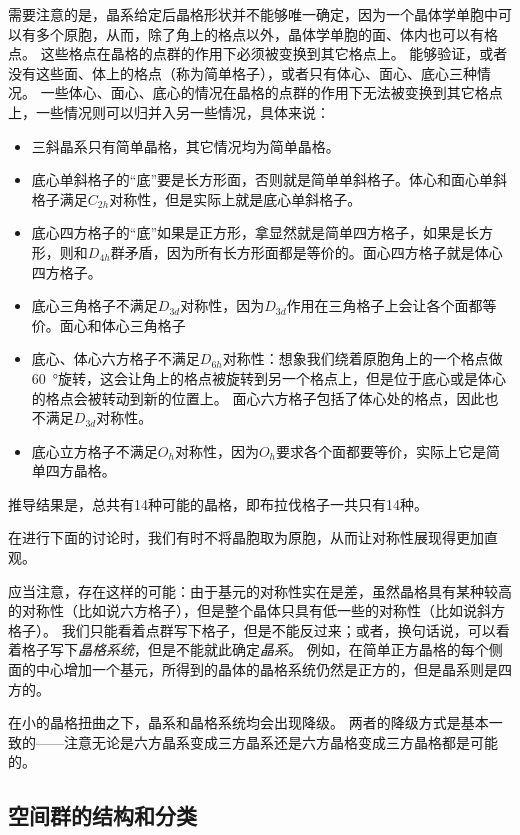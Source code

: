 需要注意的是，晶系给定后晶格形状并不能够唯一确定，因为一个晶体学单胞中可以有多个原胞，从而，除了角上的格点以外，晶体学单胞的面、体内也可以有格点。
这些格点在晶格的点群的作用下必须被变换到其它格点上。
能够验证，或者没有这些面、体上的格点（称为简单格子），或者只有体心、面心、底心三种情况。
一些体心、面心、底心的情况在晶格的点群的作用下无法被变换到其它格点上，一些情况则可以归并入另一些情况，具体来说：
\begin{itemize}
    \item 三斜晶系只有简单晶格，其它情况均为简单晶格。
    \item 底心单斜格子的“底”要是长方形面，否则就是简单单斜格子。体心和面心单斜格子满足$C_{2h}$对称性，但是实际上就是底心单斜格子。
    \item 底心四方格子的“底”如果是正方形，拿显然就是简单四方格子，如果是长方形，则和$D_{4h}$群矛盾，因为所有长方形面都是等价的。面心四方格子就是体心四方格子。
    \item 底心三角格子不满足$D_{3d}$对称性，因为$D_{3d}$作用在三角格子上会让各个面都等价。面心和体心三角格子%
    \item 底心、体心六方格子不满足$D_{6h}$对称性：想象我们绕着原胞角上的一个格点做\SI{60}{\degree}旋转，这会让角上的格点被旋转到另一个格点上，但是位于底心或是体心的格点会被转动到新的位置上。
    面心六方格子包括了体心处的格点，因此也不满足$D_{3d}$对称性。
    \item 底心立方格子不满足$O_h$对称性，因为$O_h$要求各个面都要等价，实际上它是简单四方晶格。
\end{itemize}
推导结果是，总共有14种可能的晶格，即布拉伐格子一共只有14种。

在进行下面的讨论时，我们有时不将晶胞取为原胞，从而让对称性展现得更加直观。

应当注意，存在这样的可能：由于基元的对称性实在是差，虽然晶格具有某种较高的对称性（比如说六方格子），但是整个晶体只具有低一些的对称性（比如说斜方格子）。
我们只能看着点群写下格子，但是不能反过来；或者，换句话说，可以看着格子写下\emph{晶格系统}，但是不能就此确定\emph{晶系}。
例如，在简单正方晶格的每个侧面的中心增加一个基元，所得到的晶体的晶格系统仍然是正方的，但是晶系则是四方的。

在小的晶格扭曲之下，晶系和晶格系统均会出现降级。
两者的降级方式是基本一致的——注意无论是六方晶系变成三方晶系还是六方晶格变成三方晶格都是可能的。

\subsection{空间群的结构和分类}\label{sec:space-group-structure-classification}

